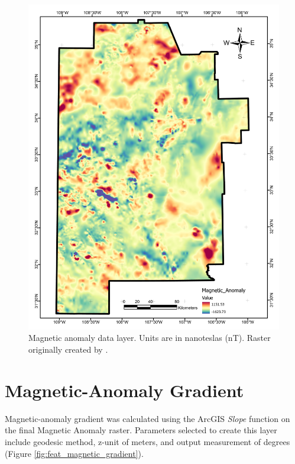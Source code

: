 \begin{figure}[H]
\centering
\includegraphics[width=0.75\linewidth]{templates/images/Figure-MagneticAnomaly.pdf}
\caption[Magnetic anomaly data layer]{Magnetic anomaly data layer. Units are in nanoteslas (nT). Raster originally created by \protect\citet{bielicki_hydrogeolgic_2015}.}
\label{fig:feat_magnetics}
\end{figure}
\pagebreak

\section{Magnetic-Anomaly Gradient}\label{app:dl_magnetic_gradient}
Magnetic-anomaly gradient was calculated using the ArcGIS \textit{Slope} function on the final Magnetic Anomaly raster. Parameters selected to create this layer include geodesic method, z-unit of meters, and output measurement of degrees (Figure \ref{fig:feat_magnetic_gradient}).

